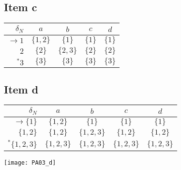 {\subsection{Item c}
\begin{center}
\begin{tabular}{r | c c c c}
	$     \delta_N$ & $a      $ & $b      $ & $c    $ & $d    $ \\ \hline
	$\rightarrow 1$ & $\{1,2\}$ & $\{1\}  $ & $\{1\}$ & $\{1\}$ \\
	$            2$ & $\{2\}  $ & $\{2,3\}$ & $\{2\}$ & $\{2\}$ \\
	$      ^\ast 3$ & $\{3\}  $ & $\{3\}  $ & $\{3\}$ & $\{3\}$
\end{tabular}
\end{center}
\subsection{Item d}
\begin{center}
\begin{tabular}{r | c c c c}
	$             \delta_N$ & $a      $ & $b      $ & $c    $ & $d    $ \\ \hline
	$\rightarrow \{1    \}$ & $\{1,2\}$ & $\{1\}  $ & $\{1\}$ & $\{1\}$ \\
	$            \{1,2  \}$ & $\{1,2\}$ & $\{1,2,3\}$ & $\{1,2\}$ & $\{1,2\}$ \\
	$      ^\ast \{1,2,3\}$ & $\{1,2,3\}$ & $\{1,2,3\}$ & $\{1,2,3\}$ & $\{1,2,3\}$ \\
\end{tabular}
\end{center}
\begin{center} \texttt{[image: PA03\_d]} \end{center}
}
